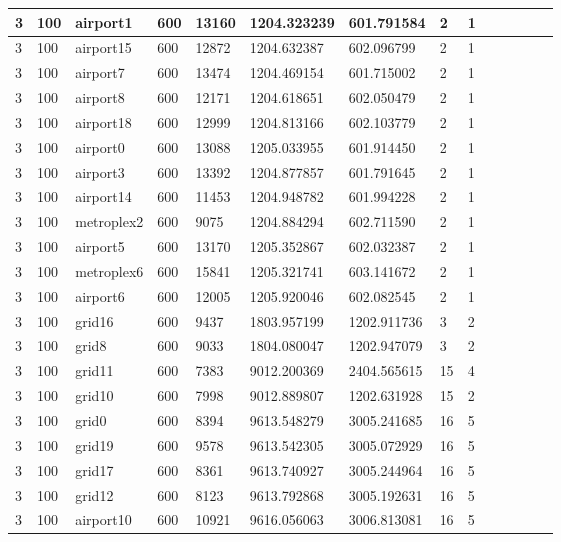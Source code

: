 \documentclass[../thesis.tex]{subfiles}
\begin{document}
\begin{table}[!ht]
\begin{tabularx}{\textwidth}{|X|X|X|X|X|X|X|X|X|X|X|X|X|X|}
        3 & 100 & airport1 & 600 & 13160 & 1204.323239 & 601.791584 & 2 & 1 \\ \hline
        3 & 100 & airport15 & 600 & 12872 & 1204.632387 & 602.096799 & 2 & 1 \\ \hline
        3 & 100 & airport7 & 600 & 13474 & 1204.469154 & 601.715002 & 2 & 1 \\ \hline
        3 & 100 & airport8 & 600 & 12171 & 1204.618651 & 602.050479 & 2 & 1 \\ \hline
        3 & 100 & airport18 & 600 & 12999 & 1204.813166 & 602.103779 & 2 & 1 \\ \hline
        3 & 100 & airport0 & 600 & 13088 & 1205.033955 & 601.914450 & 2 & 1 \\ \hline
        3 & 100 & airport3 & 600 & 13392 & 1204.877857 & 601.791645 & 2 & 1 \\ \hline
        3 & 100 & airport14 & 600 & 11453 & 1204.948782 & 601.994228 & 2 & 1 \\ \hline
        3 & 100 & metroplex2 & 600 & 9075 & 1204.884294 & 602.711590 & 2 & 1 \\ \hline
        3 & 100 & airport5 & 600 & 13170 & 1205.352867 & 602.032387 & 2 & 1 \\ \hline
        3 & 100 & metroplex6 & 600 & 15841 & 1205.321741 & 603.141672 & 2 & 1 \\ \hline
        3 & 100 & airport6 & 600 & 12005 & 1205.920046 & 602.082545 & 2 & 1 \\ \hline
        3 & 100 & grid16 & 600 & 9437 & 1803.957199 & 1202.911736 & 3 & 2 \\ \hline
        3 & 100 & grid8 & 600 & 9033 & 1804.080047 & 1202.947079 & 3 & 2 \\ \hline
        3 & 100 & grid11 & 600 & 7383 & 9012.200369 & 2404.565615 & 15 & 4 \\ \hline
        3 & 100 & grid10 & 600 & 7998 & 9012.889807 & 1202.631928 & 15 & 2 \\ \hline
        3 & 100 & grid0 & 600 & 8394 & 9613.548279 & 3005.241685 & 16 & 5 \\ \hline
        3 & 100 & grid19 & 600 & 9578 & 9613.542305 & 3005.072929 & 16 & 5 \\ \hline
        3 & 100 & grid17 & 600 & 8361 & 9613.740927 & 3005.244964 & 16 & 5 \\ \hline
        3 & 100 & grid12 & 600 & 8123 & 9613.792868 & 3005.192631 & 16 & 5 \\ \hline
        3 & 100 & airport10 & 600 & 10921 & 9616.056063 & 3006.813081 & 16 & 5 \\ \hline

\end{tabularx}
\end{table}
\end{document}
